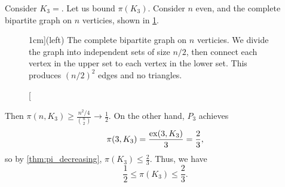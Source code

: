 Consider $K_3 =$.
Let us bound $\pi(K_3)$. Consider $n$ even, and the complete bipartite graph on $n$ verticies, shown in \cref{fig:bipartite}.

\begin{figure}
\begin{center}
\end{center}
\caption[][1cm]{(left) The complete bipartite graph on $n$ verticies. We divide the graph into independent sets of size $n/2$, then connect each vertex in the upper set to each vertex in the lower set. This produces $(n/2)^2$ edges and no triangles. \label{fig:bipartite}}
\end{figure}


 Then $\pi(n,K_3) \geq \frac{n^2/4}{{n\choose 2}} \to \frac{1}{2}$. On the other hand, $P_3$ achieves 
 \[	
 \pi(3,K_3) = \frac{\operatorname{ex}(3,K_3)}{3} = \frac{2}{3},
 \]
 so by \cref{thm:pi_decreasing},  $\pi(K_3)\leq \frac{2}{3}$.
Thus, we have
\[	
\frac{1}{2}\leq \pi(K_3)\leq \frac{2}{3}.
\]

